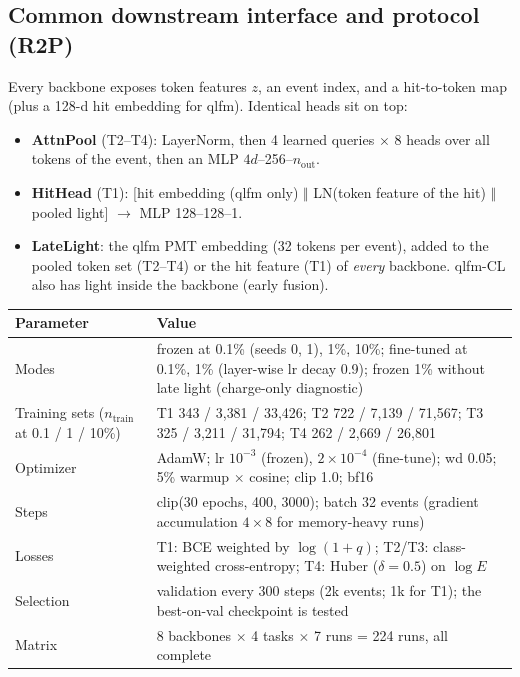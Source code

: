 \documentclass[11pt,a4paper]{article}
\begin{document}
\subsection{Common downstream interface and protocol (R2P)}
Every backbone exposes token features $z$, an event index, and a hit-to-token map (plus a 128-d hit embedding for qlfm). Identical heads sit on top:
\begin{itemize}
  \item \textbf{AttnPool} (T2--T4): LayerNorm, then 4 learned queries $\times$ 8 heads over all tokens of the event, then an MLP $4d$--256--$n_\text{out}$.
  \item \textbf{HitHead} (T1): [hit embedding (qlfm only) $\Vert$ LN(token feature of the hit) $\Vert$ pooled light] $\to$ MLP 128--128--1.
  \item \textbf{LateLight}: the qlfm PMT embedding (32 tokens per event), added to the pooled token set (T2--T4) or the hit feature (T1) of \emph{every} backbone. qlfm-CL also has light inside the backbone (early fusion).
\end{itemize}
\begin{center}\small
\begin{tabularx}{\textwidth}{lL}
\toprule
Parameter & Value\\
\midrule
Modes & frozen at 0.1\% (seeds 0, 1), 1\%, 10\%; fine-tuned at 0.1\%, 1\% (layer-wise lr decay 0.9); frozen 1\% without late light (charge-only diagnostic)\\
Training sets ($n_\text{train}$ at 0.1 / 1 / 10\%) & T1 343 / 3{,}381 / 33{,}426; T2 722 / 7{,}139 / 71{,}567; T3 325 / 3{,}211 / 31{,}794; T4 262 / 2{,}669 / 26{,}801\\
Optimizer & AdamW; lr $10^{-3}$ (frozen), $2\times10^{-4}$ (fine-tune); wd 0.05; 5\% warmup $\times$ cosine; clip 1.0; bf16\\
Steps & clip(30 epochs, 400, 3000); batch 32 events (gradient accumulation $4\times8$ for memory-heavy runs)\\
Losses & T1: BCE weighted by $\log(1+q)$; T2/T3: class-weighted cross-entropy; T4: Huber ($\delta=0.5$) on $\log E$\\
Selection & validation every 300 steps (2k events; 1k for T1); the best-on-val checkpoint is tested\\
Matrix & 8 backbones $\times$ 4 tasks $\times$ 7 runs = 224 runs, all complete\\
\bottomrule
\end{tabularx}
\end{center}
\end{document}

